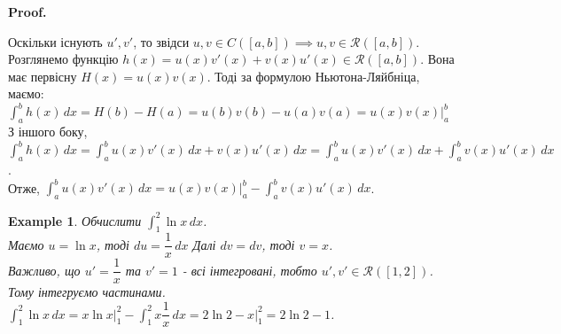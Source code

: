 \documentclass[a4paper, 10pt]{article}
\makeatletter
\def\huge{\displaystyle}
\def\qed{$\blacksquare$}
\theoremstyle{theoremdd}
\theoremstyle{theoremdd}
\theoremstyle{theoremdd}
\theoremstyle{theoremdd}
\theoremstyle{theoremdd}
\newtheorem{example}[theorem]{Example}
\theoremstyle{theoremdd}
\theoremstyle{theoremdd}
\theoremstyle{theoremdd}
\theoremstyle{theoremdd}
\renewenvironment{proof}[1][Proof.\\]{\par
\pushQED{\hfill \qed}%
\normalfont \topsep6\p@\@plus6\p@\relax
\trivlist
\item\relax
{\bfseries
#1\@addpunct{.}}\hspace\labelsep\ignorespaces
}{%
\popQED\endtrivlist\@endpefalse
}
\makeatother
\begin{document}
\begin{proof}
Оскільки існують $u',v'$, то звідси $u,v \in C([a,b]) \implies u,v \in \mathcal{R}([a,b])$.\\
Розглянемо функцію $h(x) = u(x)v'(x) + v(x)u'(x) \in \mathcal{R}([a,b])$. Вона має первісну $H(x) = u(x)v(x)$. Тоді за формулою Ньютона-Ляйбніца, маємо:\\
$\huge\int_a^b h(x)\,dx = H(b)-H(a) = u(b)v(b) - u(a)v(a) = u(x)v(x) \Big|_a^b$\\
З іншого боку, $\huge\int_a^b h(x)\,dx = \int_a^b u(x)v'(x)\,dx + v(x)u'(x)\,dx = \int_a^b u(x)v'(x)\,dx + \int_a^b v(x)u'(x)\,dx$.\\
Отже, $\huge\int_a^b u(x)v'(x)\,dx = u(x)v(x) \Big|_{a}^{b} - \int_a^b v(x)u'(x)\,dx$.
\end{proof}

\begin{example}
Обчислити $\huge\int_1^2 \ln x \,dx$.\\
Маємо $u = \ln x$, тоді $du = \dfrac{1}{x}\,dx$ \hspace{1cm} Далі $dv = dv$, тоді $v = x$.\\
Важливо, що $u' = \dfrac{1}{x}$ та $v' = 1$ - всі інтегровані, тобто $u',v' \in \mathcal{R}([1,2])$. Тому інтегруємо частинами.\\
$\huge\int_1^2 \ln x \,dx = x \ln x \Big|_1^2 - \int_1^2 x \dfrac{1}{x}\,dx = 2 \ln 2 - x\Big|_1^2 = 2 \ln 2 - 1$.
\end{example}
\end{document}
